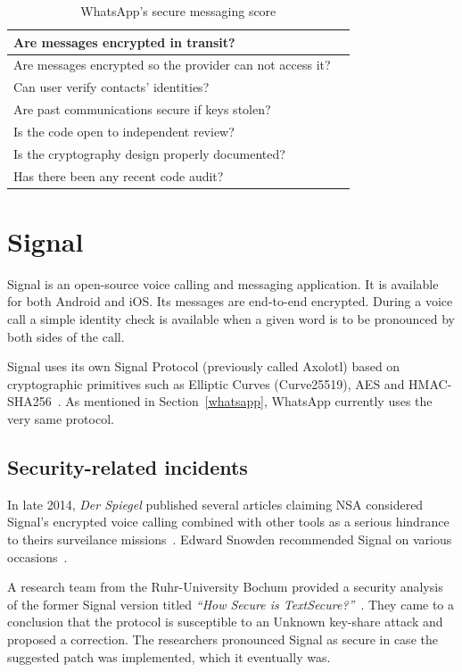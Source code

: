\documentclass[thesis=M,english]{FITthesis}[2012/10/20]
\newcommand{\cmark}{\ding{51}}%
\newcommand{\xmark}{\ding{55}}%
\begin{document}
\begin{table}[htb]
	\centering
	\caption{WhatsApp's secure messaging score}
	\label{my-label}
	\begin{tabular}{|l|l|}
		\hline
		Are messages encrypted in transit? & \cmark \\\hline
		Are messages encrypted so the provider can not access it? & \cmark \\ \hline
		Can user verify contacts' identities? & \cmark \\ \hline
		Are past communications secure if keys stolen? & \cmark \\ \hline
		Is the code open to independent review? & \xmark \\ \hline
		Is the cryptography design properly documented? & \cmark \\ \hline
		Has there been any recent code audit? & \cmark \\ \hline
	\end{tabular}
\end{table}


\section{Signal}

Signal is an open-source voice calling and messaging application. It is available for both Android and iOS. Its messages are end-to-end encrypted. During a voice call a simple identity check is available when a given word is to be pronounced by both sides of the call.

Signal uses its own Signal Protocol (previously called Axolotl) based on cryptographic primitives such as Elliptic Curves (Curve25519), AES and HMAC-SHA256~\cite{signal-bochum}. As mentioned in Section~\ref{whatsapp}, WhatsApp currently uses the very same protocol.

\subsection{Security-related incidents}

In late 2014, \emph{Der Spiegel} published several articles claiming NSA considered Signal's encrypted voice calling combined with other tools as a serious hindrance to theirs surveilance missions~\cite{signal-spiegel}. Edward Snowden recommended Signal on various occasions~\cite{signal-snowden,signal-snowden2}.

A research team from the Ruhr-University Bochum provided a security analysis of the former Signal version titled \emph{``How Secure is TextSecure?''}~\cite{signal-bochum}. They came to a conclusion that the protocol is susceptible to an Unknown key-share attack and proposed a correction. The researchers pronounced Signal as secure in case the suggested patch was implemented, which it eventually was.
\end{document}
